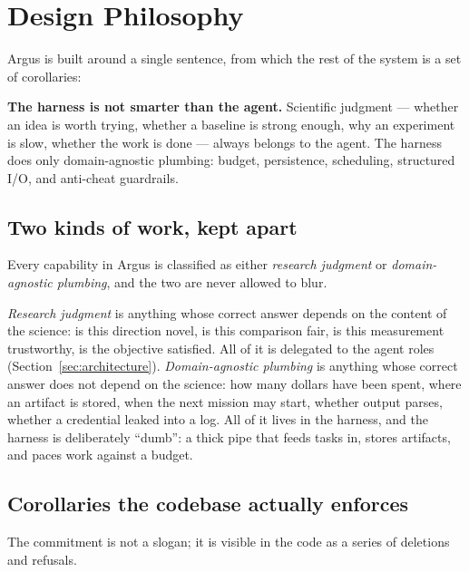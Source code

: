 \section{Design Philosophy}
\label{sec:design}

Argus is built around a single sentence, from which the rest of the system is a
set of corollaries:

\begin{callout}
\textbf{The harness is not smarter than the agent.} Scientific judgment ---
whether an idea is worth trying, whether a baseline is strong enough, why an
experiment is slow, whether the work is done --- always belongs to the agent. The
harness does only domain-agnostic plumbing: budget, persistence, scheduling,
structured I/O, and anti-cheat guardrails.
\end{callout}

\subsection{Two kinds of work, kept apart}

Every capability in Argus is classified as either \emph{research judgment} or
\emph{domain-agnostic plumbing}, and the two are never allowed to blur.

\emph{Research judgment} is anything whose correct answer depends on the content
of the science: is this direction novel, is this comparison fair, is this
measurement trustworthy, is the objective satisfied. All of it is delegated to
the agent roles (Section~\ref{sec:architecture}). \emph{Domain-agnostic plumbing}
is anything whose correct answer does not depend on the science: how many dollars
have been spent, where an artifact is stored, when the next mission may start,
whether output parses, whether a credential leaked into a log. All of it lives in
the harness, and the harness is deliberately ``dumb'': a thick pipe that feeds
tasks in, stores artifacts, and paces work against a budget.

\subsection{Corollaries the codebase actually enforces}

The commitment is not a slogan; it is visible in the code as a series of
deletions and refusals.

